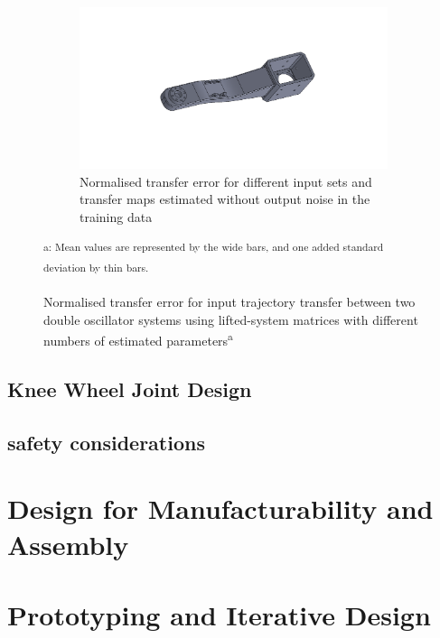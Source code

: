 \begin{figure}[h!]
\begin{subfigure}[t]{1\textwidth}
		\includegraphics[width=0.99\textwidth]{Body_Knee_Joint_3}
		\caption{Normalised transfer error for different input sets and transfer maps estimated without output noise in the training data}
		\label{subfig:sim1_lsd_results_freq}
	\end{subfigure}
	\caption[Double Oscillator -- Transfer Error (Transfer Matrix)]
	{Normalised transfer error for input trajectory transfer between two double oscillator systems using lifted-system matrices with different numbers of estimated parameters\textsuperscript{\textcolor{note_color}{a}}}
	\raggedright\small\textsuperscript{\hspace{0.132\textwidth}\textcolor{note_color}{a}: Mean values are represented by the wide bars, and one added standard deviation by thin bars.}
	\label{fig:sim1_lsd_results}
\end{figure}


\subsection{Knee Wheel Joint Design}

\subsection{safety considerations}





\section{Design for Manufacturability and Assembly}
\section{Prototyping and Iterative Design}


